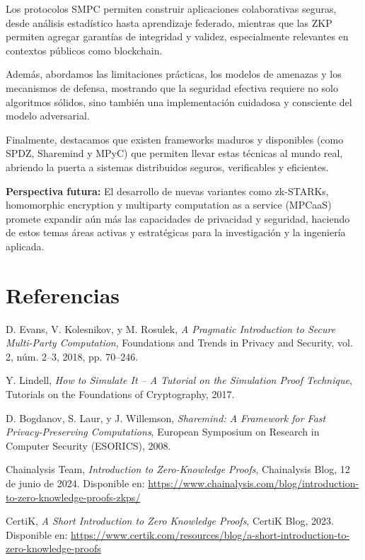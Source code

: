 \documentclass{article}
\begin{document}
Los protocolos SMPC permiten construir aplicaciones colaborativas seguras, desde análisis estadístico hasta aprendizaje federado, mientras que las ZKP permiten agregar garantías de integridad y validez, especialmente relevantes en contextos públicos como blockchain.

Además, abordamos las limitaciones prácticas, los modelos de amenazas y los mecanismos de defensa, mostrando que la seguridad efectiva requiere no solo algoritmos sólidos, sino también una implementación cuidadosa y consciente del modelo adversarial.

Finalmente, destacamos que existen frameworks maduros y disponibles (como SPDZ, Sharemind y MPyC) que permiten llevar estas técnicas al mundo real, abriendo la puerta a sistemas distribuidos seguros, verificables y eficientes.

\textbf{Perspectiva futura:} 
El desarrollo de nuevas variantes como zk-STARKs, homomorphic encryption y multiparty computation as a service (MPCaaS) promete expandir aún más las capacidades de privacidad y seguridad, haciendo de estos temas áreas activas y estratégicas para la investigación y la ingeniería aplicada.

\section{Referencias}

\begin{thebibliography}{99}

D. Evans, V. Kolesnikov, y M. Rosulek, 
\textit{A Pragmatic Introduction to Secure Multi-Party Computation}, 
Foundations and Trends in Privacy and Security, vol. 2, núm. 2–3, 2018, pp. 70–246.

Y. Lindell, 
\textit{How to Simulate It – A Tutorial on the Simulation Proof Technique}, 
Tutorials on the Foundations of Cryptography, 2017.

D. Bogdanov, S. Laur, y J. Willemson, 
\textit{Sharemind: A Framework for Fast Privacy-Preserving Computations}, 
European Symposium on Research in Computer Security (ESORICS), 2008.

Chainalysis Team, 
\textit{Introduction to Zero-Knowledge Proofs}, 
Chainalysis Blog, 12 de junio de 2024. Disponible en: \url{https://www.chainalysis.com/blog/introduction-to-zero-knowledge-proofs-zkps/}

CertiK, 
\textit{A Short Introduction to Zero Knowledge Proofs}, 
CertiK Blog, 2023. Disponible en: \url{https://www.certik.com/resources/blog/a-short-introduction-to-zero-knowledge-proofs}

\end{thebibliography}
\end{document}
